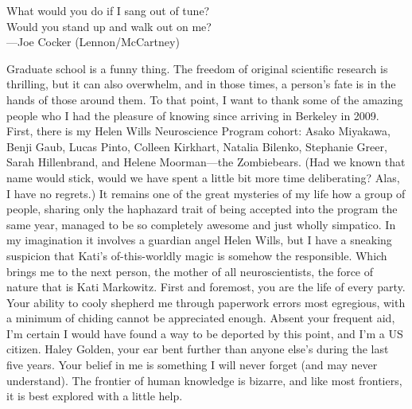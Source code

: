 \documentclass{ucbthesis}
\begin{document}
\begin{frontmatter}
\begin{acknowledgements}
\vfil\null
\begin{center}
What would you do if I sang out of tune?\\Would you stand up and walk out on me?\\
\vspace{5 mm}
 ---Joe Cocker (Lennon/McCartney)
\end{center}
\vfil\null
Graduate school is a funny thing. The freedom of original scientific research is thrilling, but it can also overwhelm, and in those times, a person's fate is in the hands of those around them. To that point, I want to thank some of the amazing people who I had the pleasure of knowing since arriving in Berkeley in 2009. First, there is my Helen Wills Neuroscience Program cohort: Asako Miyakawa, Benji Gaub, Lucas Pinto, Colleen Kirkhart, Natalia Bilenko, Stephanie Greer, Sarah Hillenbrand, and Helene Moorman---the Zombiebears. (Had we known that name would stick, would we have spent a little bit more time deliberating? Alas, I have no regrets.) It remains one of the great mysteries of my life how a group of people, sharing only the haphazard trait of being accepted into the program the same year, managed to be so completely awesome and just wholly simpatico. In my imagination it involves a guardian angel Helen Wills, but I have a sneaking suspicion that Kati's of-this-worldly magic is somehow the responsible. Which brings me to the next person, the mother of all neuroscientists, the force of nature that is Kati Markowitz. First and foremost, you are the life of every party. Your ability to cooly shepherd me through paperwork errors most egregious, with a minimum of chiding cannot be appreciated enough. Absent your frequent aid, I'm certain I would have found a way to be deported by this point, and I'm a US citizen. Haley Golden, your ear bent further than anyone else's during the last five years. Your belief in me is something I will never forget (and may never understand). The frontier of human knowledge is bizarre, and like most frontiers, it is best explored with a little help.
\end{acknowledgements}

\end{frontmatter}

\pagestyle{headings}







\printbibliography
\end{document}
